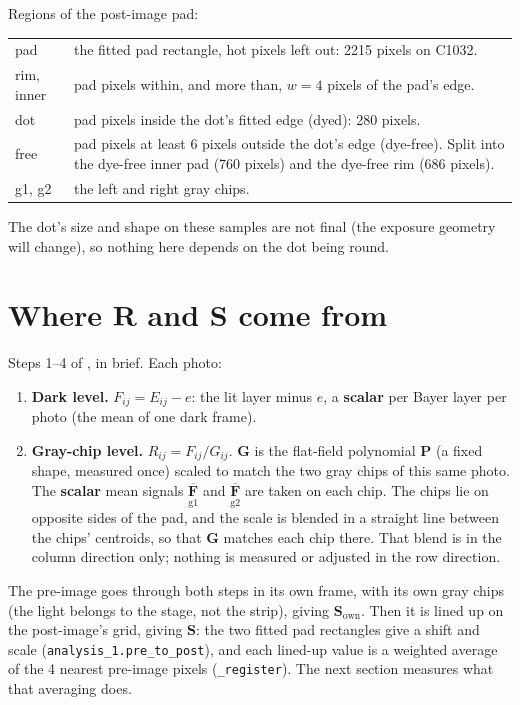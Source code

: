 \documentclass[11pt,letterpaper]{article}
\newcommand{\file}[1]{\texttt{\seqsplit{#1}}}
\newcommand{\code}[1]{\texttt{#1}}
\newcommand{\SCALAR}{\textbf{scalar}}
\newcommand{\mR}{\mathbf{R}}   %
\newcommand{\mS}{\mathbf{S}}   %
\newcommand{\mF}{\mathbf{F}}   %
\newcommand{\mG}{\mathbf{G}}   %
\newcommand{\mP}{\mathbf{P}}   %
\newcommand{\Sown}{\mathbf{S}_{\text{own}}}
\newcommand{\reg}[2]{\underset{\text{#1}}{#2}}
\newcommand{\avg}[2]{\overline{\reg{#1}{#2}}}
\begin{document}
\medskip
\noindent Regions of the post-image pad:

\medskip
\begin{tabular}{@{}L{3.2cm}L{11.4cm}@{}}
\toprule
pad & the fitted pad rectangle, hot pixels left out: 2215 pixels on C1032. \\
rim, inner & pad pixels within, and more than, $w = 4$ pixels of the pad's
  edge. \\
dot & pad pixels inside the dot's fitted edge (dyed): 280 pixels. \\
free & pad pixels at least 6 pixels outside the dot's edge (dye-free).
  Split into the dye-free inner pad (760 pixels) and the dye-free rim (686
  pixels). \\
g1, g2 & the left and right gray chips. \\
\bottomrule
\end{tabular}

\medskip
\noindent The dot's size and shape on these samples are not final (the
exposure geometry will change), so nothing here depends on the dot being
round.

\section{Where \texorpdfstring{$\mR$ and $\mS$}{R and S} come from}
\label{sec:chain}

Steps 1--4 of \file{analysis\_chain.tex}, in brief.  Each photo:
\begin{enumerate}
  \item \textbf{Dark level.}  $F_{ij} = E_{ij} - e$: the lit layer minus
    $e$, a \SCALAR{} per Bayer layer per photo (the mean of one dark
    frame).
  \item \textbf{Gray-chip level.}  $R_{ij} = F_{ij} / G_{ij}$.  $\mG$ is
    the flat-field polynomial $\mP$ (a fixed shape, measured once) scaled to
    match the two gray chips of this same photo.  The \SCALAR{} mean signals
    $\avg{g1}{\mF}$ and $\avg{g2}{\mF}$ are taken on each chip.  The chips
    lie on opposite sides of the pad, and the scale is blended in a straight
    line between the chips' centroids, so that $\mG$ matches each chip there.
    That blend is in the column direction only; nothing is measured or
    adjusted in the row direction.
\end{enumerate}
The pre-image goes through both steps in its own frame, with its own gray
chips (the light belongs to the stage, not the strip), giving $\Sown$.
Then it is lined up on the post-image's grid, giving $\mS$: the two fitted
pad rectangles give a shift and scale (\code{analysis\_1.pre\_to\_post}),
and each lined-up value is a weighted average of the 4 nearest pre-image
pixels (\code{\_register}).  The next section measures what that averaging
does.
\end{document}
